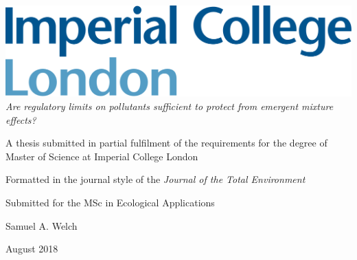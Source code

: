 \documentclass[final,1p,times]{elsarticle}
\begin{document}
\begin{titlepage}
\includegraphics{icl_logo.png}
\centering
\textit{Are regulatory limits on pollutants sufficient to protect from emergent mixture effects?}

A thesis submitted in partial fulfilment of the requirements for the degree of Master of Science at Imperial College London

Formatted in the journal style of the \textit{Journal of the Total Environment}

Submitted for the MSc in Ecological Applications

Samuel A. Welch

August 2018
\end{titlepage}
\end{document}
